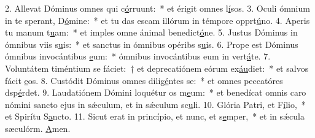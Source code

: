 2. Allevat Dóminus omnes qui c\uline{ó}rruunt:~* et érigit omnes l\uline{í}sos.
3. Oculi ómnium in te sperant, D\uline{ó}mine:~* et tu das escam illórum in témpore opprt\uline{ú}no.
4. Aperis tu manum t\uline{u}am:~* et imples omne ánimal benedict\uline{ó}ne.
5. Justus Dóminus in ómnibus viis s\uline{u}is:~* et sanctus in ómnibus opéribs s\uline{u}is.
6. Prope est Dóminus ómnibus invocántibus \uline{e}um:~* ómnibus invocántibus eum in vert\uline{á}te.
7. Voluntátem timéntium se fáciet:~† et deprecatiónem eórum ex\uline{áu}diet:~* et salvos fácit \uline{e}os.
8. Custódit Dóminus omnes dilig\uline{é}ntes se:~* et omnes peccatóres dsp\uline{é}rdet.
9. Laudatiónem Dómini loquétur os m\uline{e}um:~* et benedícat omnis caro nómini sancto ejus in sǽculum, et in sǽculum sc\uline{u}li.
10. Glória Patri, et F\uline{í}lio,~* et Spirítu S\uline{a}ncto.
11. Sicut erat in princípio, et nunc, et s\uline{e}mper,~* et in sǽcula sæculórm. \uline{A}men.
